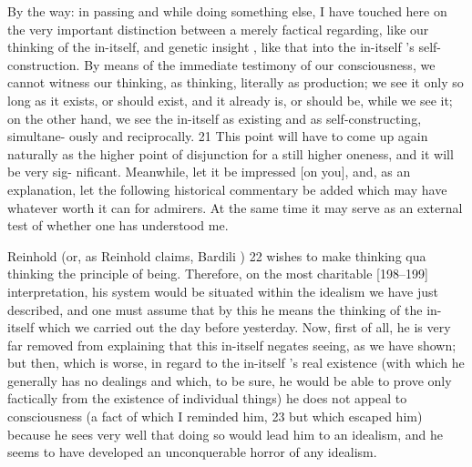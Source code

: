 By the way: in passing and while doing something else, I
have touched here on the very important distinction between a merely factical
regarding, like our thinking of the in-itself, and genetic
insight , like that into the in-itself ’s self-construction.
By
means of the immediate testimony of our consciousness, we cannot witness
our thinking, as thinking, literally as production; we see it only so long as it
exists, or should exist, and it already is, or should be, while we see it; on the
other hand, we see the in-itself as existing and as self-constructing, simultane-
ously and reciprocally.
21 This point will have to come up again naturally as the
higher point of disjunction for a still higher oneness, and it will be very sig-
nificant.
Meanwhile, let it be impressed [on you], and, as an explanation, let
the following historical commentary be added which may have whatever
worth it can for admirers.
At the same time it may serve as an external test of
whether one has understood me.

Reinhold (or, as Reinhold claims, Bardili ) 22 wishes to make thinking qua
thinking the principle of being.
Therefore, on the most charitable [198–199]
interpretation, his system would be situated within the idealism we have just
described, and one must assume that by this he means the thinking of the in-
itself which we carried out the day before yesterday.
Now, first of all, he is very
far removed from explaining that this in-itself negates seeing, as we have
shown; but then, which is worse, in regard to the in-itself ’s real existence (with
which he generally has no dealings and which, to be sure, he would be able to
prove only factically from the existence of individual things) he does not
appeal to consciousness (a fact of which I reminded him, 23 but which escaped
him) because he sees very well that doing so would lead him to an idealism,
and he seems to have developed an unconquerable horror of any idealism.

